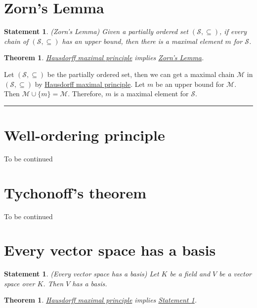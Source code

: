 \documentclass[12pt]{article}
\numberwithin{equation}{section}
\theoremstyle{plain} %
\newtheorem{theorem}[equation]{Theorem}
\newtheorem{statement}[equation]{Statement}
\theoremstyle{definition}
\theoremstyle{remark}
\newenvironment{proof}{{\bf Proof:}}{\hfill\rule{2mm}{2mm}}
\begin{document}
\section{Zorn's Lemma}

\begin{statement}
\label{statement:Zorn's Lemma}
\textup{(Zorn's Lemma)} \textit{Given a partially ordered set $(\mathcal{S}, \subseteq)$, if every chain of $(\mathcal{S}, \subseteq)$ has an upper bound, then there is a maximal element $m$ for $\mathcal{S}$. }
\end{statement}

\begin{theorem}
\hyperref[statement:Hausdorff maximal principle]{Hausdorff maximal principle} implies \hyperref[statement:Zorn's Lemma]{Zorn's Lemma}.
\end{theorem}

\begin{proof}
Let $(\mathcal{S}, \subseteq)$ be the partially ordered set, then we can get a maximal chain  $\mathcal{M}$ in $(\mathcal{S}, \subseteq)$ by \hyperref[statement:Hausdorff maximal principle]{Hausdorff maximal principle}. Let $m$ be an upper bound for $\mathcal{M}$. Then $\mathcal{M} \cup \{m\} = \mathcal{M}$. Therefore, $m$ is a maximal element for $\mathcal{S}$. 
\end{proof}

\section{Well-ordering principle}
To be continued

\section{Tychonoff's theorem}
To be continued

\section{Every vector space has a basis}

\begin{statement}
\label{statement:Every vector space has a basis}
\label{statement:Every vector space has a basis}
\textup{(Every vector space has a basis)} \textit{Let $K$ be a field and ${V}$ be a vector space over ${K}$. Then ${V}$ has a basis.}
\end{statement}

\begin{theorem}
\hyperref[statement:Hausdorff maximal principle]{Hausdorff maximal principle} implies \hyperref[statement:Every vector space has a basis]{Statement \ref*{statement:Every vector space has a basis}}. 
\end{theorem}
\end{document}
